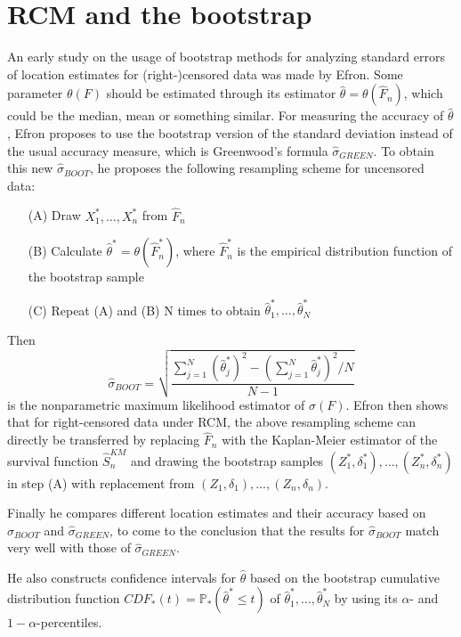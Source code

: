 \section{RCM and the bootstrap}

An early study on the usage of bootstrap methods for analyzing standard errors of location estimates for (right-)censored data was made by Efron\cite{PAPER1}. 
Some parameter $\theta(F)$ should be estimated through its estimator $\hat{\theta} = \theta(\hat{F}_n)$, which could be the median, mean or something similar. 
For measuring the accuracy of $\hat{\theta}$, Efron proposes to use the bootstrap version of the standard deviation instead of the usual accuracy measure, which is Greenwood's formula $\hat{\sigma}_{GREEN}$. To obtain this new $\hat{\sigma}_{BOOT}$, he proposes the following resampling scheme for uncensored data:
\begin{resampling_scheme}
\begin{itemize}
\item[(A)] Draw $X_1^*,\ldots,X_n^*$ from $\hat{F}_n$
\item[(B)] Calculate $\hat{\theta}^* = \theta(\hat{F}_n^*)$, where $\hat{F}_n^*$ is the empirical distribution function of the bootstrap sample
\item[(C)] Repeat (A) and (B) N times to obtain $\hat{\theta}_1^*,\ldots,\hat{\theta}_N^*$
\end{itemize}
\end{resampling_scheme}
Then 
\[
\hat{\sigma}_{BOOT} = \sqrt{\frac{\sum_{j=1}^{N}\left(\hat{\theta}_j^*\right)^2 - \left(\sum_{j=1}^{N}\hat{\theta}_j^*\right)^2/N}{N-1}}
\]
is the nonparametric maximum likelihood estimator of $\sigma(F)$.
Efron then shows that for right-censored data under RCM, the above resampling scheme can directly be transferred by replacing $\hat{F}_n$ with the Kaplan-Meier estimator of the survival function $\hat{S}_n^{KM}$ and drawing the bootstrap samples $(Z_1^*,\delta_1^*),\ldots,(Z_n^*,\delta_n^*)$ in step (A) with replacement from $(Z_1,\delta_1),\ldots,(Z_n,\delta_n)$.

Finally he compares different location estimates and their accuracy based on $\hat{\sigma}_{BOOT}$ and $\hat{\sigma}_{GREEN}$, to come to the conclusion that the results for $\hat{\sigma}_{BOOT}$ match very well with those of $\hat{\sigma}_{GREEN}$.

He also constructs confidence intervals for $\hat{\theta}$ based on the bootstrap cumulative distribution function $CDF_*(t) = \mathbb{P}_*(\hat{\theta}^*\leq t)$ of $\hat{\theta}_1^*,\ldots,\hat{\theta}_N^*$ by using its $\alpha$- and $1-\alpha$-percentiles.


